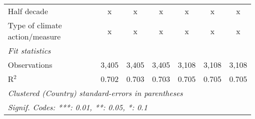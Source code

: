\begin{tabular}{lcccccc}
   Half decade                                        & x       & x             & x             & x             & x             & x\\  
   Type of climate action/measure                     & x       & x             & x             & x             & x             & x\\  
   \midrule \emph{Fit statistics}\\
   Observations                                       & 3,405   & 3,405         & 3,405         & 3,108         & 3,108         & 3,108\\  
   R$^2$                                              & 0.702   & 0.703         & 0.703         & 0.705         & 0.705         & 0.705\\  
   \midrule
   \multicolumn{7}{l}{\emph{Clustered (Country) standard-errors in parentheses}}\\
   \multicolumn{7}{l}{\emph{Signif. Codes: ***: 0.01, **: 0.05, *: 0.1}}\\
\end{tabular}
\par\endgroup


